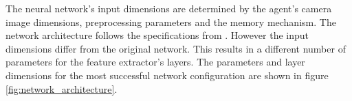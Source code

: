 The neural network's input dimensions are determined by the agent's camera image dimensions, preprocessing parameters and the memory mechanism. The network architecture follows the specifications from \autocite{human_level_control}. However the input dimensions differ from the original network. This results in a different number of parameters for the feature extractor's layers.
The parameters and layer dimensions for the most successful network configuration are shown in figure \ref{fig:network_architecture}.





